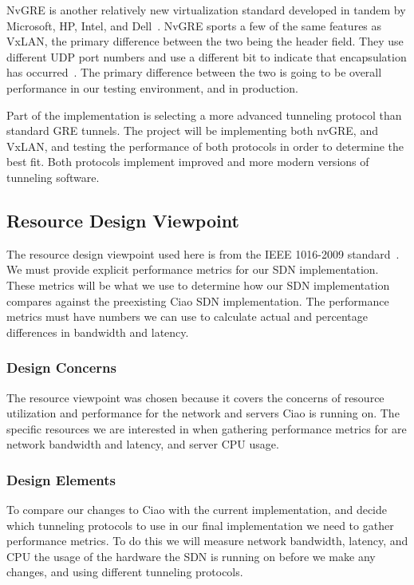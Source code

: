 \documentclass[10pt,onecolumn,journal,draftclsnofoot]{IEEEtran}
\begin{document}
NvGRE is another relatively new virtualization standard developed in tandem by
Microsoft, HP, Intel, and Dell~\cite{nvgre-info}. NvGRE sports a few of the
same features as VxLAN, the primary difference between the two being the header
field. They use different UDP port numbers and use a different bit to indicate
that encapsulation has occurred~\cite{nvgre}. The primary difference between the
two is going to be overall performance in our testing environment, and in
production.

Part of the implementation is selecting a more advanced tunneling protocol than
standard GRE tunnels. The project will be implementing both nvGRE, and VxLAN,
and testing the performance of both protocols in order to determine the best
fit. Both protocols implement improved and more modern versions of tunneling
software. 

\subsection{Resource Design Viewpoint}
The resource design viewpoint used here is from the IEEE 1016-2009 
standard~\cite{ieee1016}.
We must provide explicit performance metrics for our SDN implementation.
These metrics will be what we use to determine how our SDN implementation
compares against the preexisting Ciao SDN implementation. 
The performance metrics must have numbers we can use to calculate actual and 
percentage differences in bandwidth and latency.

\subsubsection{Design Concerns}
The resource viewpoint was chosen because it covers the 
concerns of resource utilization and performance for the network and servers 
Ciao is running on.
The specific resources we are interested in when gathering performance metrics 
for are network bandwidth and latency, and server CPU usage.

\subsubsection{Design Elements}
To compare our changes to Ciao with the current implementation, and decide 
which tunneling protocols to use in our final implementation we need to gather 
performance metrics.
To do this we will measure network bandwidth, latency, 
and CPU the usage of the hardware the SDN is running on before we make any 
changes, and using different tunneling protocols.
\end{document}
